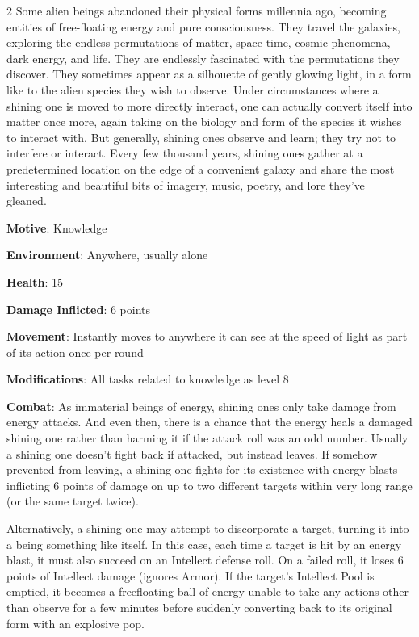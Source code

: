 \begin{multicols}{2}
Some alien beings abandoned their physical forms millennia ago, becoming entities of free-floating energy and pure consciousness. They travel the galaxies, exploring the endless permutations of matter, space-time, cosmic phenomena, dark energy, and life. They are endlessly fascinated with the permutations they discover. They sometimes appear as a silhouette of gently glowing light, in a form like to the alien species they wish to observe. Under circumstances where a shining one is moved to more directly interact, one can actually convert itself into matter once more, again taking on the biology and form of the species it wishes to interact with. But generally, shining ones observe and learn; they try not to interfere or interact. Every few thousand years, shining ones gather at a predetermined location on the edge of a convenient galaxy and share the most interesting and beautiful bits of imagery, music, poetry, and lore they’ve gleaned. 

\textbf{Motive}: Knowledge 

\textbf{Environment}: Anywhere, usually alone 

\textbf{Health}: 15 

\textbf{Damage Inflicted}: 6 points 

\textbf{Movement}: Instantly moves to anywhere it can see at the speed of light as part of its action once per round

\textbf{Modifications}: All tasks related to knowledge as level 8 

\textbf{Combat}: As immaterial beings of energy, shining ones only take damage from energy attacks. And even then, there is a chance that the energy heals a damaged shining one rather than harming it if the attack roll was an odd number. Usually a shining one doesn’t fight back if attacked, but instead leaves. If somehow prevented from leaving, a shining one fights for its existence with energy blasts inflicting 6 points of damage on up to two different targets within very long range (or the same target twice). 

Alternatively, a shining one may attempt to discorporate a target, turning it into a being something like itself. In this case, each time a target is hit by an energy blast, it must also succeed on an Intellect defense roll. On a failed roll, it loses 6 points of Intellect damage (ignores Armor). If the target’s Intellect Pool is emptied, it becomes a freefloating ball of energy unable to take any actions other than observe for a few minutes before suddenly converting back to its original form with an explosive pop. 


\end{multicols}

